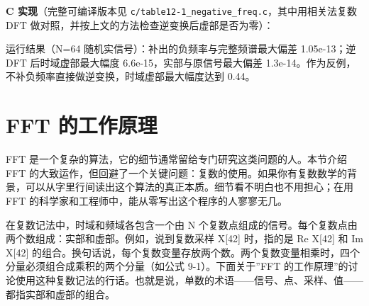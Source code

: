 \textbf{C 实现}（完整可编译版本见
\texttt{c/table12-1\_negative\_freq.c}，其中用相关法复数 DFT
做对照，并按上文的方法检查逆变换后虚部是否为零）：

\begin{Shaded}
\begin{Highlighting}[]
 \OperatorTok{(} \OperatorTok{*}\OperatorTok{,}  \OperatorTok{*}\OperatorTok{,} \OperatorTok{)}
\OperatorTok{\{}
     \OperatorTok{(}\OperatorTok{=}\OperatorTok{/}  \OperatorTok{+} \OperatorTok{;}\OperatorTok{\textless{}=}\OperatorTok{{-}} \OperatorTok{;}\OperatorTok{++)} \OperatorTok{\{}  
\OperatorTok{[}\OperatorTok{]} \OperatorTok{=}\OperatorTok{[}\OperatorTok{{-}}\OperatorTok{];}                    
\OperatorTok{[}\OperatorTok{]} \OperatorTok{=} \OperatorTok{{-}}\OperatorTok{[}\OperatorTok{{-}}\OperatorTok{];}                   
    \OperatorTok{\}}
\OperatorTok{\}}
\end{Highlighting}
\end{Shaded}

运行结果（N=64 随机实信号）：补出的负频率与完整频谱最大偏差 1.05e-13；逆
DFT 后时域虚部最大幅度 6.6e-15，实部与原信号最大偏差
1.3e-14。作为反例，不补负频率直接做逆变换，时域虚部最大幅度达到 0.44。

\section{FFT 的工作原理}

FFT 是一个复杂的算法，它的细节通常留给专门研究这类问题的人。本节介绍 FFT
的大致运作，但回避了一个关键问题：复数的使用。如果你有复数数学的背景，可以从字里行间读出这个算法的真正本质。细节看不明白也不用担心；在用
FFT 的科学家和工程师中，能从零写出这个程序的人寥寥无几。

在复数记法中，时域和频域各包含一个由 N
个复数点组成的信号。每个复数点由两个数组成：实部和虚部。例如，说到复数采样
X{[}42{]} 时，指的是 Re X{[}42{]} 和 Im X{[}42{]}
的组合。换句话说，每个复数变量存放两个数。两个复数变量相乘时，四个分量必须组合成乘积的两个分量（如公式
9-1）。下面关于''FFT
的工作原理''的讨论使用这种复数记法的行话。也就是说，单数的术语------信号、点、采样、值------都指实部和虚部的组合。

